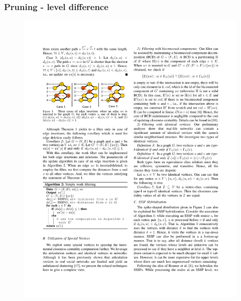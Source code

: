 \begin{frame}
  \frametitle{Pruning - level difference}

  \begin{figure}[H]
    \centering
    \includegraphics[width=\textwidth, height=0.7\textheight, keepaspectratio]{imgs/sksc-algo2}
  \end{figure}
\end{frame}


